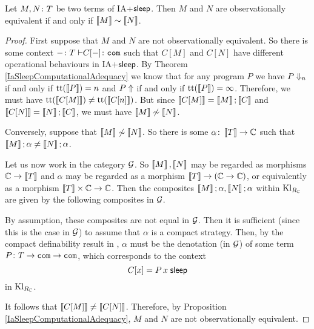 \documentclass{article}
\begin{document}
\begin{theorem}
  Let $M,N\colon T$ be two terms of IA+${\mathsf{sleep}}$.  
  Then $M$ and $N$ are observationally equivalent if and only if $\left\llbracket M\right\rrbracket\sim\left\llbracket N\right\rrbracket$.
  \label{IaSleepTimeComplexity}
\end{theorem}
\begin{proof}
  First suppose that $M$ and $N$ are not observationally equivalent.  
  So there is some context $-\colon T{\;\vdash} C[-]\colon{\mathtt{com}}$ such that $C[M]$ and $C[N]$ have different operational behaviours in IA+${\mathsf{sleep}}$.
  By Theorem \ref{IaSleepComputationalAdequacy} we know that for any program $P$ we have $P\Downarrow_n$ if and only if $\mathrm{tt}(\left\llbracket P\right\rrbracket)=n$ and $P\Uparrow$ if and only if $\mathrm{tt}(\left\llbracket P\right\rrbracket)=\infty$.
  Therefore, we must have $\mathrm{tt}(\left\llbracket C[M]\right\rrbracket)\ne \mathrm{tt}(\left\llbracket C[n]\right\rrbracket)$.  
  But since $\left\llbracket C[M]\right\rrbracket=\left\llbracket M\right\rrbracket;\left\llbracket C\right\rrbracket$ and $\left\llbracket C[N]\right\rrbracket=\left\llbracket N\right\rrbracket;\left\llbracket C\right\rrbracket$, we must have $\left\llbracket M\right\rrbracket\not\sim \left\llbracket N\right\rrbracket$.

  Conversely, suppose that $\left\llbracket M\right\rrbracket \not\sim \left\llbracket N\right\rrbracket$.  
  So there is some $\alpha\colon \left\llbracket T\right\rrbracket \to \mathbb{C}$ such that $\left\llbracket M\right\rrbracket;\alpha\ne\left\llbracket N\right\rrbracket;\alpha$.

  Let us now work in the category $\mathcal G$.  
  So $\left\llbracket M\right\rrbracket,\left\llbracket N\right\rrbracket$ may be regarded as morphisms $\mathbb{C} \to \left\llbracket T\right\rrbracket$ and $\alpha$ may be regarded as a morphism $\left\llbracket T\right\rrbracket \to (\mathbb{C} \to \mathbb{C})$, or equivalently as a morphism $\left\llbracket T\right\rrbracket\times \mathbb{C} \to \mathbb{C}$.
  Then the composites $\left\llbracket M\right\rrbracket;\alpha,\left\llbracket N\right\rrbracket;\alpha$ within $\operatorname{Kl}_{R_{\mathbb{C}}}$ are given by the following composites in $\mathcal G$.
  By assumption, these composites are not equal in $\mathcal G$.  
  Then it is sufficient (since this is the case in $\mathcal G$) to assume that $\alpha$ is a compact strategy.
  Then, by the compact definability result in \cite{SamsonGuyIAActive}, $\alpha$ must be the denotation (in $\mathcal G$) of some term $P\colon T \to {\mathtt{com}} \to {\mathtt{com}}$, which corresponds to the context
  \[
    C[x] = P\,x\;{\mathsf{sleep}}
    \]
  in $\operatorname{Kl}_{R_{\mathbb{C}}}$.

  It follows that $\left\llbracket C[M]\right\rrbracket \ne \left\llbracket C[N]\right\rrbracket$.  
  Therefore, by Proposition \ref{IaSleepComputationalAdequacy}, $M$ and $N$ are not observationally equivalent.
\end{proof}



\end{document}
